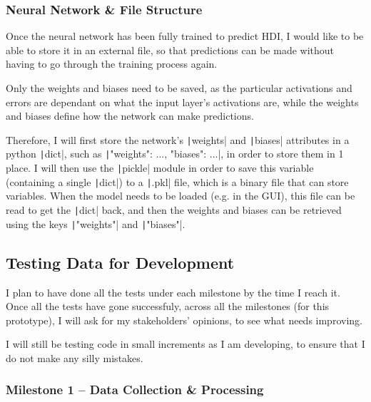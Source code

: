 \documentclass[12pt]{report}
\newcommand{\pil}[1]{\protect\texttt|#1|}
\begin{document}
\subsubsection{Neural Network \& File Structure}
Once the neural network has been fully trained to predict HDI, I would like to be able to store it in an external file, so that predictions can be made without having to go through the training process again.

Only the weights and biases need to be saved, as the particular activations and errors are dependant on what the input layer's activations are, while the weights and biases define how the network can make predictions.

Therefore, I will first store the network's \pil{weights} and \pil{biases} attributes in a python \pil{dict}, such as \texttt|{"weights": ..., "biases": ...}|, in order to store them in 1 place. I will then use the \pil{pickle} module in order to save this variable (containing a single \pil{dict}) to a \pil{.pkl} file, which is a binary file that can store variables. When the model needs to be loaded (e.g. in the GUI), this file can be read to get the \pil{dict} back, and then the weights and biases can be retrieved using the keys \pil{"weights"} and \pil{"biases"}.

\subsection{Testing Data for Development}
I plan to have done all the tests under each milestone by the time I reach it. Once all the tests have gone successfuly, across all the milestones (for this prototype), I will ask for my stakeholders' opinions, to see what needs improving.

I will still be testing code in small increments as I am developing, to ensure that I do not make any silly mistakes.
\subsubsection{Milestone 1 -- Data Collection \& Processing}
\begin{center}
\end{center}
\end{document}
